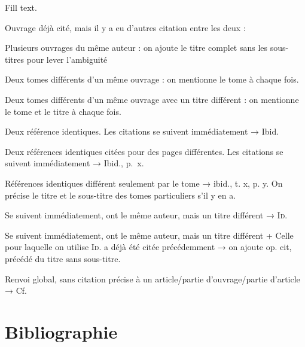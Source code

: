 Fill text.\autocite{unarticle}

\newpage
Ouvrage déjà cité, mais il y a eu d'autres citation entre les deux :
\autocite[15]{poucet}\autocite{test}\autocite[31]{poucet}

\newpage
Plusieurs ouvrages du même auteur : on ajoute le titre complet sans les sous-titres pour lever l'ambiguité
\autocite[146]{genettemim}\autocite{test}\autocite[16--29]{genettefig}\autocite{test}\autocite[103]{genettemim}

\newpage
Deux tomes différents d'un même ouvrage : on mentionne le tome à chaque fois.
\autocite[103]{martin1}\autocite{test}\autocite[71]{martin2}

\newpage
Deux tomes différents d'un même ouvrage avec un titre différent : on mentionne le tome et le titre à chaque fois.
\autocite[115]{remond1}\autocite{test}\autocite{remond2}

\newpage
Deux référence identiques. Les citations se suivent immédiatement → Ibid.
\autocite[41--57]{leclerc}\autocite[41--57]{leclerc}

\newpage
Deux références identiques citées pour des pages différentes. Les citations se suivent immédiatement → Ibid., p.~x.
\autocite[105]{vouilloux}\autocite[80]{vouilloux}

\newpage
Références identiques différent seulement par le tome → ibid., t. x, p. y. %
On précise le titre et le sous-titre des tomes particuliers s'il y en a.
\autocite[115]{remondx1}\autocite[45]{remondx2}

\newpage
Se suivent immédiatement, ont le même auteur, mais un titre différent → \textsc{Id.}
\autocite[197]{genettexmim}\autocite[91]{genettexfig}

\newpage
Se suivent immédiatement, ont le même auteur, mais un titre différent + Celle pour laquelle on utilise \textsc{Id.} a déjà été citée précédemment → on ajoute op. cit, précédé du titre sans sous-titre.
\autocite[79--93]{genetteyfig}\autocite[146]{genetteymim}\autocite[103]{genetteyfig}

\newpage
Renvoi global, sans citation précise à un article/partie d'ouvrage/partie d'article → Cf.
\autocite[Cf.][]{delatte}




\newpage
\section{Bibliographie}





